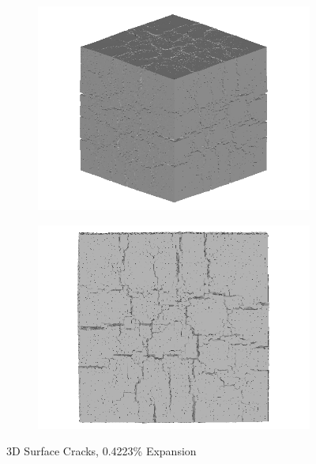   \begin{figure}[ht!]
  \centering
      \begin{subfigure}{.5\textwidth}
        \centering
        \includegraphics[width=.8\linewidth]{Files/exp_3D/DEF/A30X0C_3_3d.png}
      \end{subfigure}%
      \begin{subfigure}{.5\textwidth}
        \centering
        \includegraphics[width=.8\linewidth]{Files/exp_3D/DEF/A30X0C_3_3ds.png}
        \end{subfigure}
    \caption{3D Surface Cracks, 0.4223\% Expansion}
    \label{fig:DEF_A30X0C_3_3D}
  \end{figure}
  
